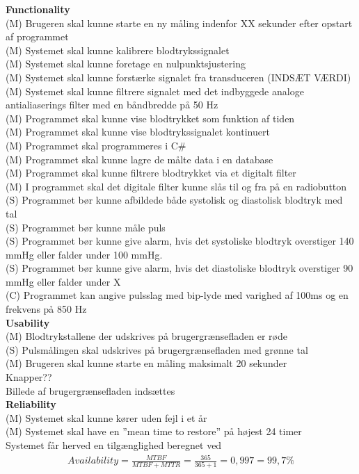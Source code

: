 \textbf{Functionality}\\
(M) Brugeren skal kunne starte en ny måling indenfor XX sekunder efter opstart af programmet \\
(M) Systemet skal kunne kalibrere blodtrykssignalet\\
(M) Systemet skal kunne foretage en nulpunktsjustering\\
(M) Systemet skal kunne forstærke signalet fra transduceren (INDSÆT VÆRDI)\\
(M) Systemet skal kunne filtrere signalet med det indbyggede analoge antialiaserings filter med en båndbredde på 50 Hz \\
(M) Programmet skal kunne vise blodtrykket som funktion af tiden\\
(M) Programmet skal kunne vise blodtrykssignalet kontinuert\\
(M) Programmet skal programmeres i C\#\\
(M) Programmet skal kunne lagre de målte data i en database\\
(M) Programmet skal kunne filtrere blodtrykket via et digitalt filter\\
(M) I programmet skal det digitale filter kunne slås til og fra på en radiobutton\\
(S) Programmet bør kunne afbildede både systolisk og diastolisk blodtryk med tal\\
(S) Programmet bør kunne måle puls\\
(S) Programmet bør kunne give alarm, hvis det systoliske blodtryk overstiger 140 mmHg eller falder under 100 mmHg. \\
(S) Programmet bør kunne give alarm, hvis det diastoliske blodtryk overstiger 90 mmHg eller falder under X\\
(C) Programmet kan angive pulsslag med bip-lyde med varighed af 100ms og en frekvens på 850 Hz\\

\textbf{Usability}\\
(M) Blodtrykstallene der udskrives på brugergrænsefladen er røde\\
(S) Pulsmålingen skal udskrives på brugergrænsefladen med grønne tal\\
(M) Brugeren skal kunne starte en måling maksimalt 20 sekunder\\
Knapper??\\
Billede af brugergrænsefladen indsættes\\

\textbf{Reliability}\\
(M) Systemet skal kunne kører uden fejl i et år\\
(M) Systemet skal have en ”mean time to restore” på højest 24 timer\\
Systemet får herved en tilgænglighed beregnet ved \begin{align}
Availability = \frac{MTBF}{MTBF+MTTR} = \frac{365}{365+1} = 0,997 = 99,7 \%
\end{align}\\

